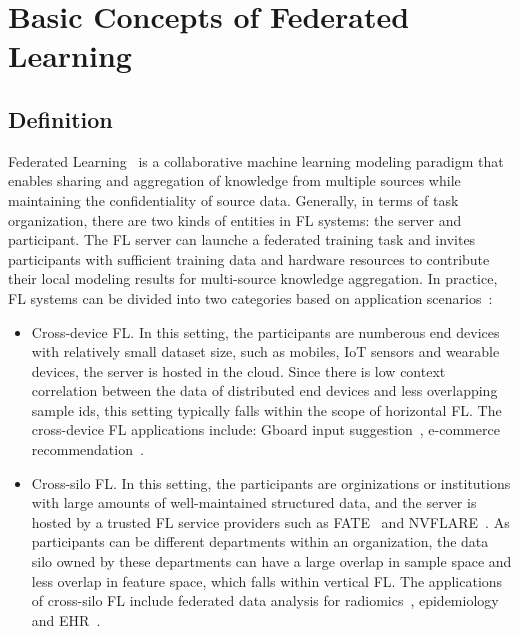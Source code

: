 \section{Basic Concepts of Federated Learning}

\subsection{Definition}
Federated Learning~\cite{IEEEstd3652, mcmahan2017communication} is a collaborative machine learning modeling paradigm that enables sharing and aggregation of knowledge from multiple sources while maintaining the confidentiality of source data.
Generally, in terms of task organization, there are two kinds of entities in FL systems: the server and participant. 
The FL server can launche a federated training task and invites participants with sufficient training data and hardware resources to contribute their local modeling results for multi-source knowledge aggregation.
In practice, FL systems can be divided into two categories based on application scenarios~\cite{kairouz2021advances}:
\begin{itemize}
    \item Cross-device FL. In this setting, the participants are numberous end devices with relatively small dataset size, such as mobiles, IoT sensors and wearable devices, the server is hosted in the cloud. Since there is low context correlation between the data of distributed end devices and less overlapping sample ids, this setting typically falls within the scope of horizontal FL. The cross-device FL applications include: Gboard input suggestion~\cite{hard2018federated,ramaswamy2019federated,yang2018applied}, e-commerce recommendation~\cite{niu2020billion}.
    
    \item Cross-silo FL. In this setting, the participants are orginizations or institutions with large amounts of well-maintained structured data, and the server is hosted by a trusted FL service providers such as FATE~\cite{liu2021fate} and NVFLARE~\cite{roth2022nvidia}. As participants can be different departments within an organization, the data silo owned by these departments can have a large overlap in sample space and less overlap in feature space, which falls within vertical FL. The applications of cross-silo FL include federated data analysis for radiomics~\cite{li2019privacy, li2020multi, scherer2020joint}, epidemiology~\cite{dayan2021federated} and EHR~\cite{brisimi2018federated, huang2019patient}.
\end{itemize}

